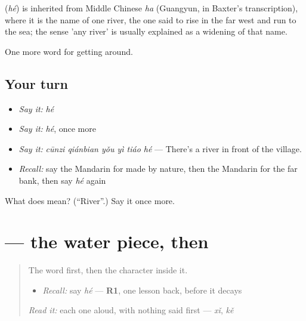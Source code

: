 \begin{cousinweb}
\textbf{} (\emph{hé}) is inherited from Middle Chinese \emph{ha} (Guangyun, in Baxter's transcription), where it is the name of one river, the one said to rise in the far west and run to the sea; the sense 'any river' is usually explained as a widening of that name.
\end{cousinweb}

\begin{grammarlens}[title={What you've built}]
One more word for getting around.
\end{grammarlens}

\subsection*{Your turn}
\begin{itemize}
\raggedright
  \item \emph{Say it:} \emph{hé}
  \item \emph{Say it:} \emph{hé}, once more
  \item \emph{Say it:} \emph{cūnzi qiánbian yǒu yì tiáo hé} — There's a river in front of the village.
  \item \emph{Recall:} say the Mandarin for made by nature, then the Mandarin for the far bank, then say \emph{hé} again
\end{itemize}

\begin{tcolorbox}[breakable,colback=teal!4,colframe=teal!35!black,title={Before you move on}]
What does  mean? (\textquotedblleft{}River\textquotedblright{}.) Say it once more.
\end{tcolorbox}
\section[\texorpdfstring{\zh{河} (hé)}{河 (hé)}]{ — the water piece, then }

\label{lesson:ZH-W442-he-river}



\begin{quote}
The word first, then the character inside it.

\begin{itemize}
\raggedright
  \item \emph{Recall:} say \emph{hé} — \textbf{R1}, one lesson back, before it decays
\end{itemize}

\begin{quote}
 
\end{quote}

\emph{Read it:} each one aloud, with nothing said first — \emph{xǐ}, \emph{kě}
\end{quote}

